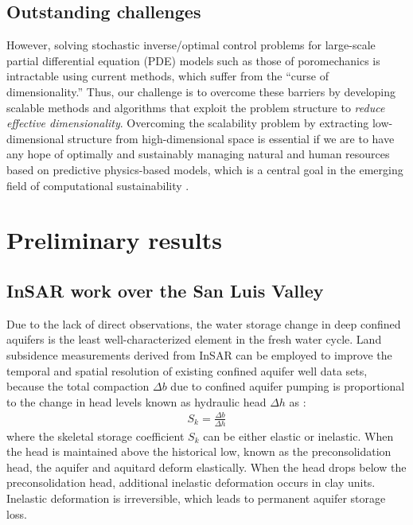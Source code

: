 \documentclass[11pt,final]{article}%
\renewcommand{\citep}{\cite}
\begin{document}
\subsection{Outstanding challenges}\label{sec:challenges}
However, solving stochastic inverse/optimal control problems for large-scale partial differential equation (PDE) models such as those of poromechanics is intractable using current methods, which suffer from the ``curse of dimensionality.''  Thus, our challenge is to overcome these barriers by developing scalable methods and algorithms that exploit the problem structure to {\em reduce effective dimensionality}. Overcoming the scalability problem by extracting low-dimensional structure from high-dimensional space is essential if we are to have any hope of optimally and sustainably managing natural and human resources based on predictive physics-based models, which is a central goal in the emerging field of computational
sustainability \cite{NRC2012}.


\section{Preliminary results}\label{sec:previous}
\subsection{InSAR work over the San Luis Valley}\label{sec:previous InSAR}
Due to the lack of direct observations, the water storage change in deep confined aquifers is the least well-characterized element in the fresh water cycle. Land subsidence measurements derived from InSAR can be employed to improve the temporal and spatial resolution of existing confined aquifer well data sets, because the total compaction $\Delta b$ due to confined aquifer pumping is proportional to the change in head levels known as hydraulic head $\Delta h$ as \citep[e.g.,][]{galloway2011}:
\begin{align}
  S_{k} = \frac{\Delta b}{\Delta h}
\label{eq:elastic}  
\end{align}
where the skeletal storage coefficient $S_{k}$ can be either elastic or inelastic. When the head is maintained above the historical low, known as the preconsolidation head, the aquifer and aquitard deform elastically. When the head drops below the preconsolidation head, additional inelastic deformation occurs in clay units. Inelastic deformation is irreversible, which leads to permanent aquifer storage loss. 
\end{document}

